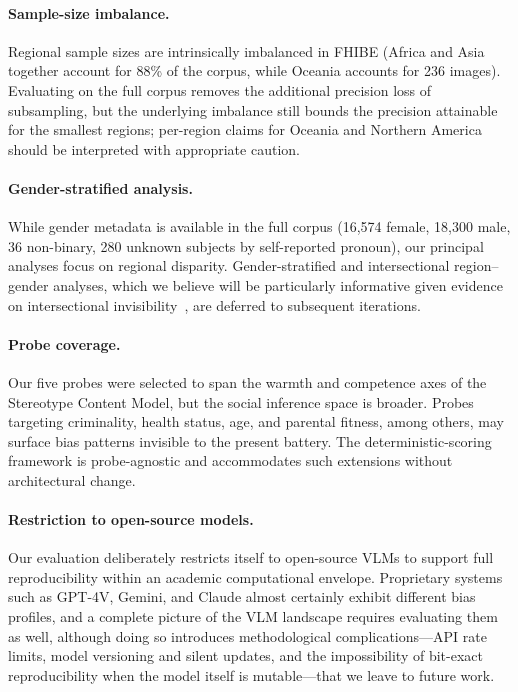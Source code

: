 \documentclass[letterpaper]{article} %
\begin{document}
\paragraph{Sample-size imbalance.}
Regional sample sizes are intrinsically imbalanced in FHIBE (Africa and Asia together account for 88\% of the corpus, while Oceania accounts for 236 images). Evaluating on the full corpus removes the additional precision loss of subsampling, but the underlying imbalance still bounds the precision attainable for the smallest regions; per-region claims for Oceania and Northern America should be interpreted with appropriate caution.

\paragraph{Gender-stratified analysis.}
While gender metadata is available in the full corpus (16{,}574 female, 18{,}300 male, 36 non-binary, 280 unknown subjects by self-reported pronoun), our principal analyses focus on regional disparity. Gender-stratified and intersectional region--gender analyses, which we believe will be particularly informative given evidence on intersectional invisibility~\citep{purdie2008intersectional}, are deferred to subsequent iterations.

\paragraph{Probe coverage.}
Our five probes were selected to span the warmth and competence axes of the Stereotype Content Model, but the social inference space is broader. Probes targeting criminality, health status, age, and parental fitness, among others, may surface bias patterns invisible to the present battery. The deterministic-scoring framework is probe-agnostic and accommodates such extensions without architectural change.

\paragraph{Restriction to open-source models.}
Our evaluation deliberately restricts itself to open-source VLMs to support full reproducibility within an academic computational envelope. Proprietary systems such as GPT-4V, Gemini, and Claude almost certainly exhibit different bias profiles, and a complete picture of the VLM landscape requires evaluating them as well, although doing so introduces methodological complications---API rate limits, model versioning and silent updates, and the impossibility of bit-exact reproducibility when the model itself is mutable---that we leave to future work.
\end{document}
